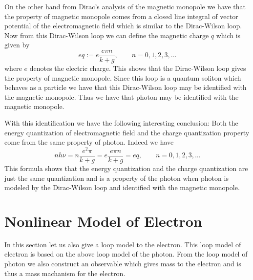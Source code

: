 \documentclass[a4paper,a4paper]{article}
\begin{document}
On the other hand from Dirac's analysis of the magnetic monopole \cite{Dir} we have that the property of magnetic monopole comes from a closed line integral of vector potential of the electromagnetic field which is similar to the Dirac-Wilson loop. Now from this Dirac-Wilson loop we can define the magnetic charge $q$ which is given by
\begin{equation} 
e q:= e\frac{e\pi n}{k+g}, \qquad n=0,1,2,3, . . .
\label{dirac}
\end{equation} 
where $e$ denotes the electric charge. This shows that the Dirac-Wilson loop gives the property of magnetic monopole. Since this loop is a quantum soliton which behaves as a particle we have that this Dirac-Wilson loop may be identified with the magnetic monopole. Thus we have that photon may be identified with the magnetic monopole.

With this identification we have the following interesting conclusion: Both the energy quantization of electromagnetic field and the charge quantization property come from the same property of photon. Indeed we have
\begin{equation} 
nh\nu=n\frac{e^2\pi}{k+g}=e\frac{e\pi n}{k+g}=eq, \qquad n=0,1,2,3, . . .
\label{dirac2}
\end{equation}
This formula shows that the energy quantization and the charge quantization are just the same quantization and is a property of the photon when photon is modeled by the Dirac-Wilson loop and identified with the magnetic monopole.

\section{Nonlinear Model of Electron}

In this section let us also give a loop model to the electron. This loop model of electron is based on the above loop model of the photon. From the loop model of photon we also construct an observable which gives mass to the electron and is thus a mass machanism for the electron.
\end{document}
